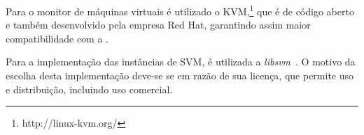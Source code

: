 Para o monitor de máquinas virtuais é utilizado o
KVM,\footnote{http://linux-kvm.org/} que é de código aberto e também
desenvolvido pela empresa Red Hat, garantindo assim maior compatibilidade
com a \libvirt{}.

Para a implementação das instâncias de SVM, é utilizada a
\emph{libsvm}~\cite{chang2001libsvm}. O motivo da escolha desta
implementação deve-se se em razão de sua licença, que permite uso e
distribuição, incluindo uso comercial.
